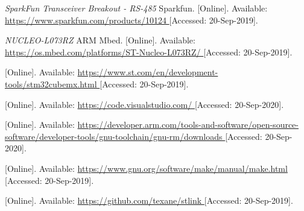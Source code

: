 \begin{thebibliography}{9}


\textit{
SparkFun Transceiver Breakout - RS-485
}
Sparkfun.
[Online]. Available:
\url{
https://www.sparkfun.com/products/10124
}
[Accessed: 20-Sep-2019].



\textit{
NUCLEO-L073RZ
}
ARM Mbed.
[Online]. Available:
\url{
https://os.mbed.com/platforms/ST-Nucleo-L073RZ/
}
[Accessed: 20-Sep-2019].



[Online]. Available:
\url{
https://www.st.com/en/development-tools/stm32cubemx.html
}
[Accessed: 20-Sep-2019].



[Online]. Available:
\url{
https://code.visualstudio.com/
}
[Accessed: 20-Sep-2020].



[Online]. Available:
\url{
https://developer.arm.com/tools-and-software/open-source-software/developer-tools/gnu-toolchain/gnu-rm/downloads
}
[Accessed: 20-Sep-2020].





[Online]. Available:
\url{
https://www.gnu.org/software/make/manual/make.html
}
[Accessed: 20-Sep-2019].



[Online]. Available:
\url{
https://github.com/texane/stlink
}
[Accessed: 20-Sep-2019].





\end{thebibliography}
